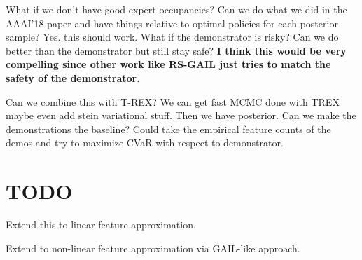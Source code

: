 \documentclass{article}
\begin{document}
What if we don't have good expert occupancies?
Can we do what we did in the AAAI'18 paper and have things relative to optimal policies for each posterior sample? Yes. this should work. What if the demonstrator is risky? Can we do better than the demonstrator but still stay safe? \textbf{I think this would be very compelling since other work like RS-GAIL just tries to match the safety of the demonstrator.}

Can we combine this with T-REX? We can get fast MCMC done with TREX maybe even add stein variational stuff. Then we have posterior. Can we make the demonstrations the baseline? Could take the empirical feature counts of the demos and try to maximize CVaR with respect to demonstrator.  
	
\section{TODO}
Extend this to linear feature approximation.

Extend to non-linear feature approximation via GAIL-like approach.





	
\end{document}
